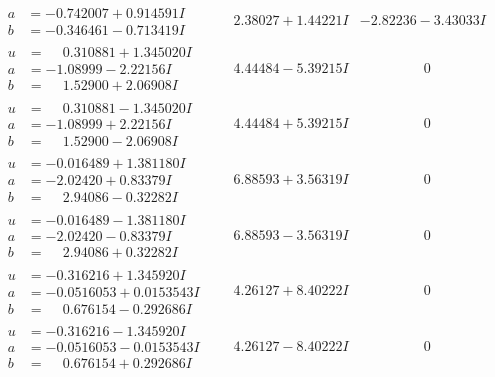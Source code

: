 \documentclass[1p]{elsarticle_modified}
\theoremstyle{definition}
\begin{document}
$$\begin{array}{c|c|c}
\begin{aligned}
a &= -0.742007 + 0.914591 I \\
b &= -0.346461 - 0.713419 I\end{aligned}
 & \phantom{-}2.38027 + 1.44221 I & -2.82236 - 3.43033 I \\ \hline\begin{aligned}
u &= \phantom{-}0.310881 + 1.345020 I \\
a &= -1.08999 - 2.22156 I \\
b &= \phantom{-}1.52900 + 2.06908 I\end{aligned}
 & \phantom{-}4.44484 - 5.39215 I & \phantom{-0.000000 } 0 \\ \hline\begin{aligned}
u &= \phantom{-}0.310881 - 1.345020 I \\
a &= -1.08999 + 2.22156 I \\
b &= \phantom{-}1.52900 - 2.06908 I\end{aligned}
 & \phantom{-}4.44484 + 5.39215 I & \phantom{-0.000000 } 0 \\ \hline\begin{aligned}
u &= -0.016489 + 1.381180 I \\
a &= -2.02420 + 0.83379 I \\
b &= \phantom{-}2.94086 - 0.32282 I\end{aligned}
 & \phantom{-}6.88593 + 3.56319 I & \phantom{-0.000000 } 0 \\ \hline\begin{aligned}
u &= -0.016489 - 1.381180 I \\
a &= -2.02420 - 0.83379 I \\
b &= \phantom{-}2.94086 + 0.32282 I\end{aligned}
 & \phantom{-}6.88593 - 3.56319 I & \phantom{-0.000000 } 0 \\ \hline\begin{aligned}
u &= -0.316216 + 1.345920 I \\
a &= -0.0516053 + 0.0153543 I \\
b &= \phantom{-}0.676154 - 0.292686 I\end{aligned}
 & \phantom{-}4.26127 + 8.40222 I & \phantom{-0.000000 } 0 \\ \hline\begin{aligned}
u &= -0.316216 - 1.345920 I \\
a &= -0.0516053 - 0.0153543 I \\
b &= \phantom{-}0.676154 + 0.292686 I\end{aligned}
 & \phantom{-}4.26127 - 8.40222 I & \phantom{-0.000000 } 0 \\ \hline\begin{aligned}

\end{aligned}
\end{array}$$
\end{document}
